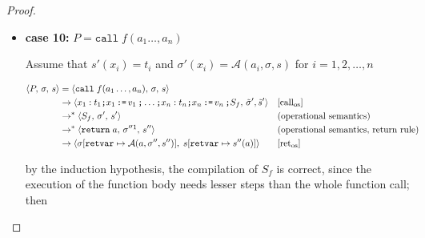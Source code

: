 \documentclass{article}
\begin{document}
\begin{proof}
\begin{itemize}
        However, the proofs above are not enough to establish the correctness of the compiled \texttt{while}-statements, because they only demonstrate one step of iteration. Nonetheless, with a simple induction, we can generalize this argument to claim that at any step of iteration, the compilation is correct, as the proofs above show that at any given program state and scope, the compilation of one iteration is correct. To put it more explicitly, the cases of 0 iterations (\textbf{subcase 6.1}) and 1 iteration (\textbf{subcase 6.2}) are proven to be correct. Assuming that $i$ iterations are compiled correctly, \textbf{subcase 6.2} also prove that $i+1$ iterations are compiled correctly. Ultimately, one can certainly say that any terminating \texttt{SelVeri} loop is compiled correctly.


  \item \textbf{case 10:} $P = \texttt{call}\; f(a_1 \dots, a_n)$

  Assume that $s'(x_i) = t_i$ and $\sigma'(x_i) = \mathcal{A}(a_i, \sigma, s)$ for $i = 1,2,\dots,n$

    \[
      \begin{aligned}
      \langle P,\, \sigma,\, s \rangle
      &=\langle \texttt{call}\; f(a_1 \dots, a_n),\, \sigma,\, s \rangle \\
      &\rightarrow \langle x_1 : t_1 \texttt{;} x_1 \,\texttt{:=}\, v_1\, \texttt{;} \dots \texttt{;} x_n : t_n \texttt{;} x_n \,\texttt{:=}\, v_n\, \texttt{;} S_f,\, \tilde{\sigma}', \tilde{s}' \rangle
      && [\text{call}_{\text{os}}]   \\
      &\rightarrow^\ast \langle S_f,\, \sigma' ,\, s' \rangle
      && (\text{operational semantics})   \\
      &\rightarrow^\ast \langle \texttt{return}\; a,\, \sigma'' \footnotemark ,\, s'' \rangle
      && (\text{operational semantics},\, \text{return rule})   \\
      &\rightarrow \langle \sigma[\texttt{retvar} \mapsto \mathcal{A}(a, \sigma'', s'')],\; s[\texttt{retvar} \mapsto s''(a)] \rangle
      && [\text{ret}_{\text{os}}] \\
      \end{aligned}
  \]

by the induction hypothesis, the compilation of $S_f$ is correct, since the execution of the function body needs lesser steps than the whole function call; then


\end{itemize}
\end{proof}
\end{document}
